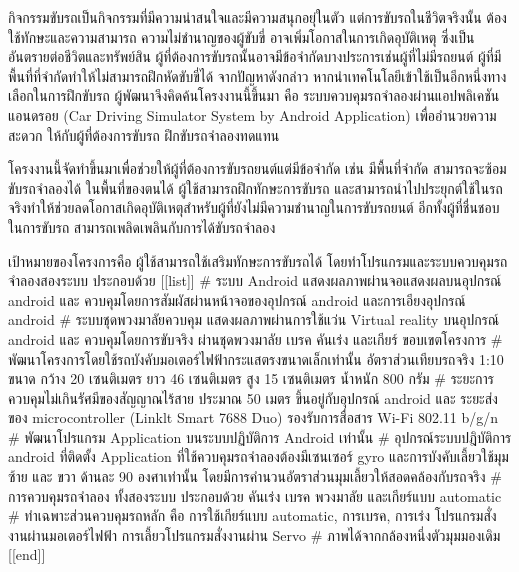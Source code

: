 
กิจกรรมขับรถเป็นกิจกรรมที่มีความน่าสนใจและมีความสนุกอยุ่ในตัว แต่การขับรถในชีวิตจริงนั้น ต้องใช้ทักษะและความสามารถ ความไม่ชำนาญของผู้ขับขี่  อาจเพิ่มโอกาสในการเกิดอุบัติเหตุ ซึ่งเป็นอันตรายต่อชีวิตและทรัพย์สิน ผู้ที่ต้องการขับรถนั้นอาจมีข้อจำกัดบางประการเช่นผู้ที่ไม่มีรถยนต์ ผู้ที่มีพื้นที่ที่จำกัดทำให้ไม่สามารถฝึกหัดขับขี่ได้ 
จากปัญหาดังกล่าว หากนำเทคโนโลยีเข้าใช้เป็นอีกหนึ่งทางเลือกในการฝึกขับรถ ผู้พัฒนาจึงคิดค้นโครงงานนี้ขึ้นมา คือ ระบบควบคุมรถจำลองผ่านแอปพลิเคชันแอนดรอย (Car Driving Simulator System by Android Application) เพื่ออำนวยความสะดวก ให้กับผู้ที่ต้องการขับรถ ฝึกขับรถจำลองทดแทน 



โครงงานนี้จัดทำขึ้นมาเพื่อช่วยให้ผู้ที่ต้องการขับรถยนต์แต่มีข้อจำกัด  เช่น มีพื้นที่จำกัด  สามารถจะซ้อมขับรถจำลองได้ ในพื้นที่ของตนได้ ผู้ใช้สามารถฝึกทักษะการขับรถ และสามารถนำไปประยุกต์ใช้ในรถจริงทำให้ช่วยลดโอกาสเกิดอุบัติเหตุสำหรับผู้ที่ยังไม่มีความชำนาญในการขับรถยนต์  อีกทั้งผู้ที่ชื่นชอบในการขับรถ สามารถเพลิดเพลินกับการได้ขับรถจำลอง

เป้าหมายของโครงการคือ ผู้ใช้สามารถใช้เสริมทักษะการขับรถได้ โดยทำโปรแกรมและระบบควบคุมรถจำลองสองระบบ ประกอบด้วย
[[list]]
# ระบบ Android แสดงผลภาพผ่านจอแสดงผลบนอุปกรณ์ android และ ควบคุมโดยการสัมผัสผ่านหน้าจอของอุปกรณ์ android และการเอียงอุปกรณ์ android
# ระบบชุดพวงมาลัยควบคุม แสดงผลภาพผ่านการใช้แว่น Virtual reality บนอุปกรณ์ android  และ ควบคุมโดยการขับจริง ผ่านชุดพวงมาลัย เบรค คันเร่ง และเกียร์
ขอบเขตโครงการ
# พัฒนาโครงการโดยใช้รถบังคับมอเตอร์ไฟฟ้ากระแสตรงขนาดเล็กเท่านั้น อัตราส่วนเทียบรถจริง 1:10  ขนาด กว้าง 20 เซนติเมตร  ยาว 46 เซนติเมตร สูง 15 เซนติเมตร น้ำหนัก 800 กรัม
# ระยะการควบคุมไม่เกินรัศมีของสัญญาณไร้สาย ประมาณ 50 เมตร ขึ้นอยู่กับอุปกรณ์ android และ ระยะส่ง ของ microcontroller (Linklt Smart 7688 Duo) รองรับการสื่อสาร Wi-Fi 802.11 b/g/n
# พัฒนาโปรแกรม Application บนระบบปฏิบัติการ Android  เท่านั้น
# อุปกรณ์ระบบปฎิบัติการ android ที่ติดตั้ง Application ที่ใช้ควบคุมรถจำลองต้องมีเซนเซอร์ gyro และการบังคับเลี้ยวใช้มุม ซ้าย และ ขวา ด้านละ 90 องศาเท่านั้น โดยมีการคำนวนอัตราส่วนมุมเลี้ยวให้สอดคล้องกับรถจริง
# การควบคุมรถจำลอง ทั้งสองระบบ ประกอบด้วย คันเร่ง เบรค พวงมาลัย และเกียร์แบบ automatic
# ทำเฉพาะส่วนควบคุมรถหลัก คือ การใช้เกียร์แบบ automatic, การเบรค, การเร่ง โปรแกรมสั่งงานผ่านมอเตอร์ไฟฟ้า  การเลี้ยวโปรแกรมสั่งงานผ่าน Servo
# ภาพได้จากกล้องหนึ่งตัวมุมมองเดิม
[[end]]

